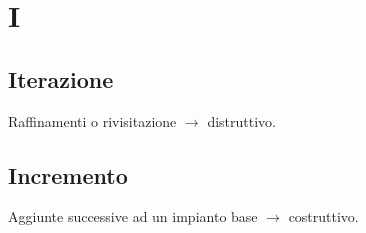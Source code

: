 \section{I}

    \subsection{Iterazione}
    \label{glossario:iterazione}
    Raffinamenti o rivisitazione $\rightarrow$ distruttivo.

    \subsection{Incremento}
    \label{glossario:incremento}
    Aggiunte successive ad un impianto base $\rightarrow$ costruttivo.

\pagebreak